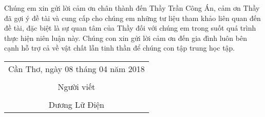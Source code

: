 \documentclass[./thesis.tex]{subfiles}
\begin{document}
Chúng em xin gửi lời cảm ơn chân thành đến Thầy Trần Công Án, cảm ơn Thầy đã gợi ý đề tài và cung cấp cho chúng em những tư liệu tham khảo liên quan đến đề tài, đặc biệt là sự quan tâm của Thầy đối với chúng em trong suốt quá trình thực hiện niên luận này. Chúng con xin gửi lời cảm ơn đến gia đình luôn bên cạnh hỗ trợ cả về vật chất lẫn tinh thần để chúng con tập trung học tập.


\hspace*{\fill}
\begin{tabular}{@{}c@{}} 
Cần Thơ, ngày 08 tháng 04 năm 2018\\ \\
Người viết\\ \\
Dương Lữ Điện
\end{tabular}
\end{document}
